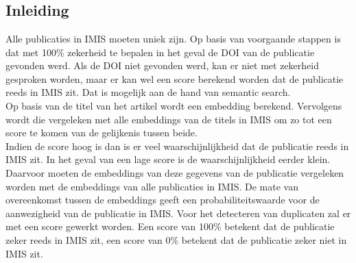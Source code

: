
\chapter{}%
\label{ch:semantic_search}

\section{Inleiding}
Alle publicaties in IMIS moeten uniek zijn. Op basis van voorgaande stappen is dat met 100\% zekerheid te bepalen in het geval de DOI van de publicatie gevonden werd.
Als de DOI niet gevonden werd, kan er niet met zekerheid gesproken worden, maar er kan wel een score berekend worden dat de publicatie reeds in IMIS zit. Dat is mogelijk aan de hand van semantic search.\\
Op basis van de titel van het artikel wordt een embedding berekend. Vervolgens wordt die vergeleken met alle embeddings van de titels in IMIS om zo tot een score te komen van de gelijkenis tussen beide.\\
Indien de score hoog is dan is er veel waarschijnlijkheid dat de publicatie reeds in IMIS zit. In het geval van een lage score is de waarschijnlijkheid eerder klein.\\
Daarvoor moeten de embeddings van deze gegevens van de publicatie vergeleken worden met de embeddings van alle publicaties in IMIS. De mate van overeenkomst tussen de embeddings geeft een probabiliteitswaarde voor de aanwezigheid van de publicatie in IMIS. Voor het detecteren van duplicaten zal er met een score gewerkt worden. Een score van 100\% betekent dat de publicatie zeker reeds in IMIS zit, een score van 0\% betekent dat de publicatie zeker niet in IMIS zit. 

